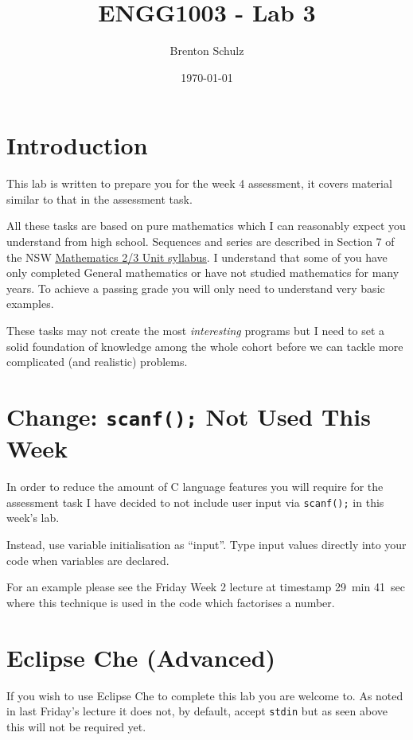 \documentclass{lab}
\title{ENGG1003 - Lab 3}
\author{Brenton Schulz}
\date{\today}
\begin{document}
\maketitle

\section{Introduction}

This lab is written to prepare you for the week 4 assessment, it covers material similar to that in the assessment task.

All these tasks are based on pure mathematics which I can reasonably expect you understand from high school. Sequences and series are described in Section 7 of the NSW \underline{\href{https://educationstandards.nsw.edu.au/wps/portal/nesa/11-12/stage-6-learning-areas/stage-6-mathematics/mathematics-syllabus}{Mathematics 2/3 Unit syllabus}}. I understand that some of you have only completed General mathematics or have not studied mathematics for many years. To achieve a passing grade you will only need to understand very basic examples.

These tasks may not create the most \textit{interesting} programs but I need to set a solid foundation of knowledge among the whole cohort before we can tackle more complicated (and realistic) problems.

\section{Change: \texttt{scanf();} Not Used This Week}

In order to reduce the amount of C language features you will require for the assessment task I have decided to not include user input via \texttt{scanf();} in this week's lab.

Instead, use variable initialisation as ``input''. Type input values directly into your code when variables are declared.

For an example please see the Friday Week 2 lecture at timestamp 29~min 41~sec where this technique is used in the code which factorises a number.

\section{Eclipse Che (Advanced)}

If you wish to use Eclipse Che to complete this lab you are welcome to. As noted in last Friday's lecture it does not, by default, accept \texttt{stdin} but as seen above this will not be required yet.
\end{document}
